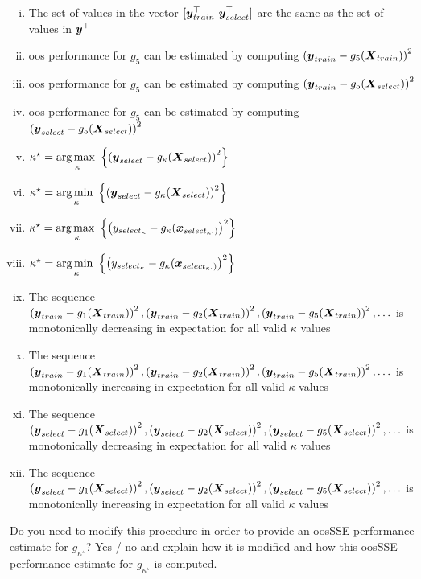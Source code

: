 \documentclass[12pt]{article}
\begin{document}
\begin{enumerate}[(a)]
\begin{enumerate}[i)]
\item \iftoggle{solutions}{\inred{TRUE}}{} The set of values in the vector $[\boldsymbol{y}_{train}^\top ~\boldsymbol{y}_{select}^\top]$ are the same as the set of values in $\boldsymbol{y}^\top$
\item oos performance for $g_5$ can be estimated by computing $\left(\boldsymbol{y}_{train} - g_5(\boldsymbol{X}_{train})\right)^2$
\item oos performance for $g_5$ can be estimated by computing $\left(\boldsymbol{y}_{train} - g_5(\boldsymbol{X}_{select})\right)^2$
\item \iftoggle{solutions}{\inred{TRUE}}{} oos performance for $g_5$ can be estimated by computing $\left(\boldsymbol{y}_{select} - g_5(\boldsymbol{X}_{select})\right)^2$
\item $\kappa^\star = \displaystyle\operatorname*{arg\,max~}_\kappa\left\{\left(\boldsymbol{y}_{select} - g_\kappa(\boldsymbol{X}_{select})\right)^2\right\}$
\item \iftoggle{solutions}{\inred{TRUE}}{} $\kappa^\star = \displaystyle\operatorname*{arg\,min~}_\kappa\left\{\left(\boldsymbol{y}_{select} - g_\kappa(\boldsymbol{X}_{select})\right)^2\right\}$
\item $\kappa^\star = \displaystyle\operatorname*{arg\,max~}_\kappa\left\{\left(y_{select_\kappa} - g_\kappa(\boldsymbol{x}_{{select}_{\kappa \cdot})}\right)^2\right\}$
\item $\kappa^\star = \displaystyle\operatorname*{arg\,min~}_\kappa\left\{\left(y_{select_\kappa} - g_\kappa(\boldsymbol{x}_{{select}_{\kappa \cdot})}\right)^2\right\}$
\item \iftoggle{solutions}{\inred{TRUE}}{} The sequence $\left(\boldsymbol{y}_{train} - g_1(\boldsymbol{X}_{train})\right)^2, \left(\boldsymbol{y}_{train} - g_2(\boldsymbol{X}_{train})\right)^2, \left(\boldsymbol{y}_{train} - g_5(\boldsymbol{X}_{train})\right)^2, \ldots$ is monotonically decreasing in expectation for all valid $\kappa$ values
\item The sequence $\left(\boldsymbol{y}_{train} - g_1(\boldsymbol{X}_{train})\right)^2, \left(\boldsymbol{y}_{train} - g_2(\boldsymbol{X}_{train})\right)^2, \left(\boldsymbol{y}_{train} - g_5(\boldsymbol{X}_{train})\right)^2, \ldots$ is monotonically increasing in expectation for all valid $\kappa$ values
\item The sequence $\left(\boldsymbol{y}_{select} - g_1(\boldsymbol{X}_{select})\right)^2, \left(\boldsymbol{y}_{select} - g_2(\boldsymbol{X}_{select})\right)^2, \left(\boldsymbol{y}_{select} - g_5(\boldsymbol{X}_{select})\right)^2, \ldots$ is monotonically decreasing in expectation for all valid $\kappa$ values
\item The sequence $\left(\boldsymbol{y}_{select} - g_1(\boldsymbol{X}_{select})\right)^2, \left(\boldsymbol{y}_{select} - g_2(\boldsymbol{X}_{select})\right)^2, \left(\boldsymbol{y}_{select} - g_5(\boldsymbol{X}_{select})\right)^2, \ldots$ is monotonically increasing in expectation for all valid $\kappa$ values
\end{enumerate}


 Do you need to modify this procedure in order to provide an oosSSE performance estimate for $g_{\kappa^\star}$? Yes / no and explain how it is modified and how this oosSSE performance estimate for $g_{\kappa^\star}$ is computed.



\end{enumerate}
\end{document}
